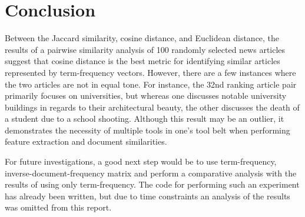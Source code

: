 \documentclass[11pt]{article}
\begin{document}
\section{Conclusion}

Between the Jaccard similarity, cosine distance, and Euclidean distance, the results of a pairwise similarity analysis of 100 randomly selected news articles suggest that cosine distance is the best metric for identifying similar articles represented by term-frequency vectors.
However, there are a few instances where the two articles are not in equal tone. For instance, the 32nd ranking article pair primarily focuses on universities, but whereas one discusses notable university buildings in regards to their architectural beauty, the other discusses the death of a student due to a school shooting.
Although this result may be an outlier, it demonstrates the necessity of multiple tools in one's tool belt when performing feature extraction and document similarities.

For future investigations, a good next step would be to use term-frequency, inverse-document-frequency matrix and perform a comparative analysis with the results of using only term-frequency.
The code for performing such an experiment has already been written, but due to time constraints an analysis of the results was omitted from this report.


{}

\end{document}
